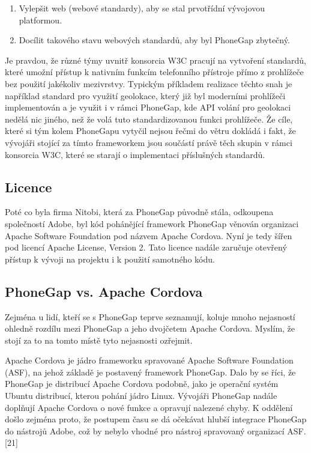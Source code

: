 \begin{enumerate}
\item Vylepšit web (webové standardy), aby se stal prvotřídní vývojovou platformou.
\item Docílit takového stavu webových standardů, aby byl PhoneGap zbytečný.
\end{enumerate}

Je pravdou, že různé týmy uvnitř konsorcia W3C pracují na vytvoření standardů, které umožní přístup k nativním funkcím telefonního přístroje přímo z prohlížeče bez použití jakékoliv mezivrstvy. Typickým příkladem realizace těchto snah je například standard pro využití geolokace, který již byl moderními prohlížeči implementován a je využit i v rámci PhoneGap, kde API volání pro geolokaci nedělá nic jiného, než že volá tuto standardizovanou funkci prohlížeče. Že cíle, které si tým kolem PhoneGapu vytyčil nejsou řečmi do větru dokládá i fakt, že vývojáři stojící za tímto frameworkem jsou součástí právě těch skupin v rámci konsorcia W3C, které se starají o implementaci příslušných standardů.

\subsection{Licence}
Poté co byla firma Nitobi, která za PhoneGap původně stála, odkoupena společností Adobe, byl kód pohánějící framework PhoneGap věnován organizaci Apache Software Foundation pod názvem Apache Cordova. Nyní je tedy šířen pod licencí Apache License, Version 2. Tato licence nadále zaručuje otevřený přístup k vývoji na projektu i k použití samotného kódu.

\subsection{PhoneGap vs. Apache Cordova}
Zejména u lidí, kteří se s PhoneGap teprve seznamují, koluje mnoho nejasností ohledně rozdílu mezi PhoneGap a jeho dvojčetem Apache Cordova. Myslím, že stojí za to na tomto místě tyto nejasnosti ozřejmit.

Apache Cordova je jádro frameworku spravované Apache Software Foundation (ASF), na jehož základě je postavený framework PhoneGap. Dalo by se říci, že PhoneGap je distribucí Apache Cordova podobně, jako je operační systém Ubuntu distribucí, kterou pohání jádro Linux. Vývojáři PhoneGap nadále doplňují Apache Cordova o nové funkce a opravují nalezené chyby. K oddělení došlo zejména proto, že postupem času se dá očekávat hlubší integrace PhoneGap do nástrojů Adobe, což by nebylo vhodné pro nástroj spravovaný organizací ASF. [21]

